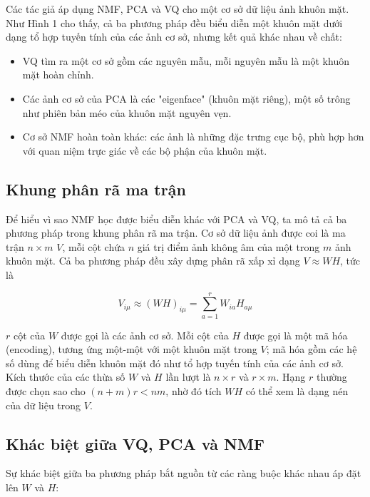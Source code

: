 Các tác giả áp dụng NMF, PCA và VQ cho một cơ sở dữ liệu ảnh khuôn mặt. Như Hình 1 cho thấy, cả ba phương pháp đều biểu diễn một khuôn mặt dưới dạng tổ hợp tuyến tính của các ảnh cơ sở, nhưng kết quả khác nhau về chất:

\begin{itemize}
\item
  VQ tìm ra một cơ sở gồm các nguyên mẫu, mỗi nguyên mẫu là một khuôn mặt hoàn chỉnh.
\item
  Các ảnh cơ sở của PCA là các "eigenface" (khuôn mặt riêng), một số trông như phiên bản méo của khuôn mặt nguyên vẹn.
\item
  Cơ sở NMF hoàn toàn khác: các ảnh là những đặc trưng cục bộ, phù hợp hơn với quan niệm trực giác về các bộ phận của khuôn mặt.
\end{itemize}

\subsection{Khung phân rã ma trận}

Để hiểu vì sao NMF học được biểu diễn khác với PCA và VQ, ta mô tả cả ba phương pháp trong khung phân rã ma trận. Cơ sở dữ liệu ảnh được coi là ma trận \(n \times m\) \(V\), mỗi cột chứa \(n\) giá trị điểm ảnh không âm của một trong \(m\) ảnh khuôn mặt. Cả ba phương pháp đều xây dựng phân rã xấp xỉ dạng \(V \approx WH\), tức là

\begin{equation*}V_{i\mu} \approx (WH)_{i\mu} = \sum_{a=1}^{r} W_{ia} H_{a\mu} \tag{1}\end{equation*}

\(r\) cột của \(W\) được gọi là các ảnh cơ sở. Mỗi cột của \(H\) được gọi là một mã hóa (encoding), tương ứng một-một với một khuôn mặt trong \(V\); mã hóa gồm các hệ số dùng để biểu diễn khuôn mặt đó như tổ hợp tuyến tính của các ảnh cơ sở. Kích thước của các thừa số \(W\) và \(H\) lần lượt là \(n \times r\) và \(r \times m\). Hạng \(r\) thường được chọn sao cho \((n+m)r < nm\), nhờ đó tích \(WH\) có thể xem là dạng nén của dữ liệu trong \(V\).

\subsection{Khác biệt giữa VQ, PCA và NMF}

Sự khác biệt giữa ba phương pháp bắt nguồn từ các ràng buộc khác nhau áp đặt lên \(W\) và \(H\):

